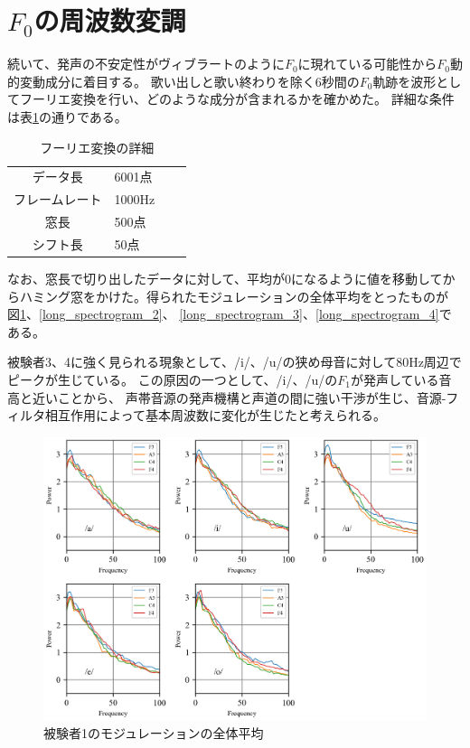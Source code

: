 \documentclass[10.5ptj,a4j,dvipdfmx,uplatex, oneside, openany, report, draft]{jsbook}%
\begin{document}
\section{$F_0$の周波数変調}
続いて、発声の不安定性がヴィブラートのように$F_0$に現れている可能性から$F_0$動的変動成分に着目する。
歌い出しと歌い終わりを除く6秒間の$F_0$軌跡を波形としてフーリエ変換を行い、どのような成分が含まれるかを確かめた。
詳細な条件は表\ref{table:F0Moduration}の通りである。


\begin{table}[h]
    \caption{フーリエ変換の詳細}
    \label{table:F0Moduration}
    \centering
    \begin{tabular}{clll}
        \hline
        データ長 & 6001点\\
        フレームレート & 1000Hz\\
        窓長 & 500点\\
        シフト長 & 50点\\
        \hline
    \end{tabular}
\end{table}


なお、窓長で切り出したデータに対して、平均が0になるように値を移動してからハミング窓をかけた。得られたモジュレーションの全体平均をとったものが
図\ref{long_spectrogram_1}、\ref{long_spectrogram_2}、
\ref{long_spectrogram_3}、\ref{long_spectrogram_4}である。



被験者3、4に強く見られる現象として、/i/、/u/の狭め母音に対して80Hz周辺でピークが生じている。
この原因の一つとして、/i/、/u/の$F_1$が発声している音高と近いことから、
声帯音源の発声機構と声道の間に強い干渉が生じ\cite{source-filterCoupling}、音源-フィルタ相互作用によって基本周波数に変化が生じたと考えられる。\cite{tsuburagi}

\begin{figure}[htbp]
    \begin{center}
      \includegraphics[clip,width=12.0cm]{long_spectrogram_1.png}
      \caption{被験者1のモジュレーションの全体平均}
      \label{long_spectrogram_1}
    \end{center}
\end{figure}
\end{document}
